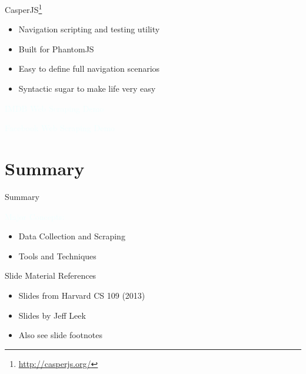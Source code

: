 \documentclass{beamer}
\newcommand{\tblue}[1]{{\Large {\textcolor{azure}{#1}}}}
\newcommand{\thblue}[1]{{\Huge {\textcolor{azure}{#1}}}}
\newcommand{\furl}[1]{{\footnote{\url{#1}}}}
\begin{document}
\begin{frame}{CasperJS\furl{http://casperjs.org/}}
    \begin{itemize}
        \item Navigation scripting and testing utility
        \item Built for PhantomJS
        \item Easy to define full navigation scenarios
        \item Syntactic sugar to make life very easy
    \end{itemize}
\end{frame}


\begin{frame}{} 
    \begin{center}
        \thblue{IMDB Web Scraping Demo}
    \end{center}
\end{frame}
\begin{frame}{} 
    \begin{center}
        \thblue{Facebook Web Scraping Demo}
    \end{center}
\end{frame}


\section{Summary}
\begin{frame}{Summary}

\tblue{Major Concepts:}
\begin{itemize}
    \item Data Collection and Scraping
    \item Tools and Techniques
\end{itemize}
\end{frame}

\begin{frame}{Slide Material References}

\begin{itemize}
    \item Slides from Harvard CS 109 (2013)
    \item Slides by Jeff Leek
    \item Also see slide footnotes
\end{itemize}
\end{frame}
\end{document}
